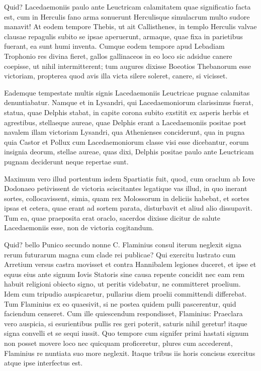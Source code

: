  Quid? Lacedaemoniis paulo ante Leuctricam calamitatem quae significatio facta est, cum in Herculis fano arma sonuerunt Herculisque simulacrum multo sudore manavit! At eodem tempore Thebis, ut ait Callisthenes, in templo Herculis valvae clausae repagulis subito se ipsae aperuerunt, armaque, quae fixa in parietibus fuerant, ea sunt humi inventa. Cumque eodem tempore apud Lebadiam Trophonio res divina fieret, gallos gallinaceos in eo loco sic adsidue canere coepisse, ut nihil intermitterent; tum augures dixisse Boeotios Thebanorum esse victoriam, propterea quod avis illa victa silere soleret, canere, si vicisset.

 Eademque tempestate multis signis Lacedaemoniis Leuctricae pugnae calamitas denuntiabatur. Namque et in Lysandri, qui Lacedaemoniorum clarissimus fuerat, statua, quae Delphis stabat, in capite corona subito exstitit ex asperis herbis et agrestibus, stellaeque aureae, quae Delphis erant a Lacedaemoniis positae post navalem illam victoriam Lysandri, qua Athenienses conciderunt, qua in pugna quia Castor et Pollux cum Lacedaemoniorum classe visi esse dicebantur, eorum insignia deorum, stellae aureae, quas dixi, Delphis positae paulo ante Leuctricam pugnam deciderunt neque repertae sunt.

 Maximum vero illud portentum isdem Spartiatis fuit, quod, cum oraclum ab Iove Dodonaeo petivissent de victoria sciscitantes legatique vas illud, in quo inerant sortes, collocavissent, simia, quam rex Molossorum in deliciis habebat, et sortes ipsas et cetera, quae erant ad sortem parata, disturbavit et aliud alio dissupavit. Tum ea, quae praeposita erat oraclo, sacerdos dixisse dicitur de salute Lacedaemoniis esse, non de victoria cogitandum.

 Quid? bello Punico secundo nonne C. Flaminius consul iterum neglexit signa rerum futurarum magna cum clade rei publicae? Qui exercitu lustrato cum Arretium versus castra movisset et contra Hannibalem legiones duceret, et ipse et equus eius ante signum Iovis Statoris sine causa repente concidit nec eam rem habuit religioni obiecto signo, ut peritis videbatur, ne committeret proelium. Idem cum tripudio auspicaretur, pullarius diem proelii committendi differebat. Tum Flaminius ex eo quaesivit, si ne postea quidem pulli pascerentur, quid faciendum censeret. Cum ille quiescendum respondisset, Flaminius: Praeclara vero auspicia, si esurientibus pullis res geri poterit, saturis nihil geretur! itaque signa convelli et se sequi iussit. Quo tempore cum signifer primi hastati signum non posset movere loco nec quicquam proficeretur, plures cum accederent, Flaminius re nuntiata suo more neglexit. Itaque tribus iis horis concisus exercitus atque ipse interfectus est.

